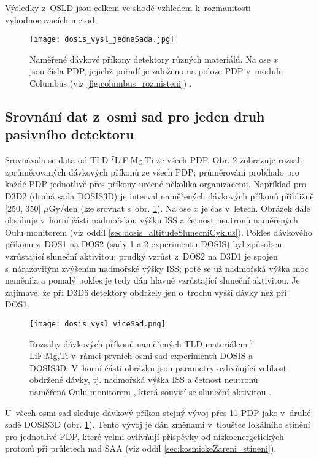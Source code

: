 Výsledky z~OSLD jsou celkem ve shodě vzhledem k~rozmanitosti vyhodnocovacích metod.
\begin{figure}[!t]
  \centering
  \texttt{[image: dosis\_vysl\_jednaSada.jpg]}
  \caption{Naměřené dávkové příkony detektory různých materiálů. Na ose $x$ jsou čísla PDP, jejichž pořadí je založeno na poloze PDP v~modulu Columbus (viz \ref{fig:columbus_rozmisteni}) \cite{dosis}.}
  \label{fig:dosis_vysl_jednaSada}
\end{figure}
\subsection{Srovnání dat z~osmi sad pro jeden druh pasivního detektoru}
Srovnávala se data od TLD $^7$LiF:Mg,Ti ze všech PDP. Obr. \ref{fig:dosis_vysl_viceSad} zobrazuje rozsah zprůměrovaných dávkových příkonů ze všech PDP; průměrování probíhalo pro každé PDP jednotlivě přes příkony určené několika organizacemi.
Například pro D3D2 (druhá sada DOSIS3D) je interval naměřených dávkových příkonů přibližně [250, 350] $\mu$Gy/den (lze srovnat s~obr. \ref{fig:dosis_vysl_jednaSada}). Na ose $x$ je čas v~letech. Obrázek dále obsahuje v~horní části nadmořskou výšku ISS a četnost neutronů naměřených Oulu monitorem (viz oddíl \ref{sec:dosis_altitudeSlunecniCyklus}). Pokles dávkového příkonu z~DOS1 na DOS2 (sady 1 a 2 experimentu DOSIS) byl způsoben vzrůstající sluneční aktivitou; prudký vzrůst z~DOS2 na D3D1 je spojen s~nárazovitým zvýšením nadmořské výšky ISS; poté se už nadmořská výška moc neměnila a pomalý pokles je tedy dán
hlavně vzrůstající sluneční aktivitou. Je zajímavé, že při D3D6 detektory obdržely jen o~trochu vyšší dávky než při DOS1.
\begin{figure}[h]
  \centering
  \texttt{[image: dosis\_vysl\_viceSad.png]}
  \caption{Rozsahy dávkových příkonů naměřených TLD materiálem $^7$LiF:Mg,Ti v~rámci prvních osmi sad experimentů DOSIS a DOSIS3D. V~horní části obrázku jsou parametry ovlivňující velikost obdržené dávky, tj. nadmořská výška ISS a četnost neutronů naměřená Oulu monitorem \cite{dosis_oulu}, která souvisí se sluneční aktivitou \cite{dosis}.}
  \label{fig:dosis_vysl_viceSad}
\end{figure}

U~všech osmi sad sleduje dávkový příkon stejný vývoj přes 11 PDP jako v~druhé sadě DOSIS3D (obr. \ref{fig:dosis_vysl_jednaSada}). Tento vývoj je  dán změnami v~tloušťce lokálního stínění pro jednotlivé PDP, které velmi ovlivňují příspěvky od nízkoenergetických protonů při průletech nad SAA (viz oddíl \ref{sec:kosmickeZareni_stineni}). 

